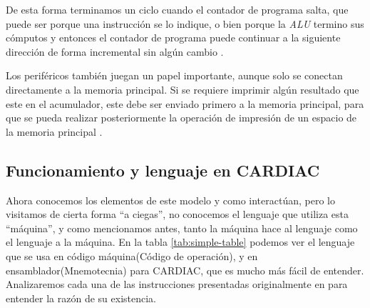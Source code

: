 \documentclass[letterpaper,12pt,oneside]{book}
\begin{document}
	De esta forma terminamos un ciclo cuando el contador de programa salta,
	 que puede ser porque una instrucción se lo indique, o bien porque
	la \textit{ALU} termino sus cómputos y entonces el contador de programa puede continuar
	 a la siguiente dirección de forma incremental
	sin algún cambio \cite{fingerman_instruction_1968}.
	
	Los periféricos también juegan un papel importante, aunque solo se conectan
	directamente a la memoria principal. Si se requiere imprimir algún resultado que este
	en el acumulador, este debe ser enviado primero
	a la memoria principal, para que se pueda realizar posteriormente 
	la operación de impresión de un espacio de la memoria principal 
	\cite{fingerman_instruction_1968}.
	
	\subsection{Funcionamiento y lenguaje en CARDIAC}	
	
	Ahora conocemos los elementos de este modelo y como interactúan, pero lo visitamos de cierta forma ``a ciegas'', no conocemos el lenguaje
	que utiliza esta ``máquina'', y como mencionamos antes, tanto la máquina hace al lenguaje como el lenguaje a la máquina. En la tabla \ref{tab:simple-table} podemos ver el lenguaje que se usa en código máquina(Código de operación), y 
	en 	ensamblador(Mnemotecnia) para CARDIAC, que es mucho más fácil de entender. Analizaremos cada una de las instrucciones presentadas
	originalmente en \cite{fingerman_instruction_1968} para entender la razón de su 
	existencia.
	
\end{document}
